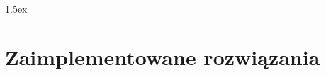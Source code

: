 \documentclass[10pt, a4paper, twoside]{article}
\begin{document}
\parskip 1.5ex %

\baselineskip=15pt  %
\linespread{1.3} %




%
%
%
%
%

\setcounter{page}{2}




\newpage
  \tableofcontents









\section{Zaimplementowane rozwiązania}  \label{zaimplementowane rozwiazania}
\end{document}
